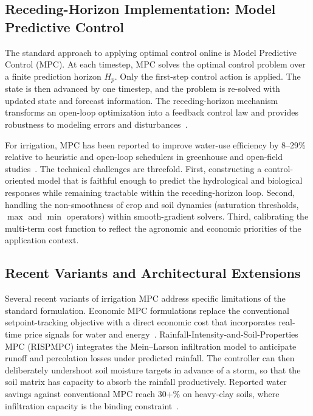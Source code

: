 \subsection{Receding-Horizon Implementation: Model Predictive Control}
\label{ssec:lit-mpc-impl}

The standard approach to applying optimal control online is Model
Predictive Control (MPC). At each timestep, MPC solves the optimal
control problem over a finite prediction horizon $H_p$. Only the
first-step control action is applied. The state is then advanced by
one timestep, and the problem is re-solved with updated state and
forecast information. The receding-horizon mechanism transforms an
open-loop optimization into a feedback control law and provides
robustness to modeling errors and
disturbances~\cite{LopezJimenez2022,Sharma2025}.

For irrigation, MPC has been reported to improve water-use efficiency
by 8--29\% relative to heuristic and open-loop schedulers in
greenhouse and open-field studies~\cite{LopezJimenez2022,Mahmud2026}.
The technical challenges are threefold. First, constructing a
control-oriented model that is faithful enough to predict the
hydrological and biological responses while remaining tractable
within the receding-horizon loop. Second, handling the non-smoothness
of crop and soil dynamics (saturation thresholds, $\max$ and $\min$
operators) within smooth-gradient solvers. Third, calibrating the
multi-term cost function to reflect the agronomic and economic
priorities of the application context.

\subsection{Recent Variants and Architectural Extensions}
\label{ssec:lit-mpc-variants}

Several recent variants of irrigation MPC address specific
limitations of the standard formulation. Economic MPC formulations
replace the conventional setpoint-tracking objective with a direct
economic cost that incorporates real-time price signals for water
and energy~\cite{Sharma2025}. Rainfall-Intensity-and-Soil-Properties
MPC (RISPMPC) integrates the Mein--Larson infiltration model to
anticipate runoff and percolation losses under predicted rainfall.
The controller can then deliberately undershoot soil moisture targets
in advance of a storm, so that the soil matrix has capacity to
absorb the rainfall productively. Reported water savings against
conventional MPC reach 30+\% on heavy-clay soils, where infiltration
capacity is the binding constraint~\cite{Sharma2025}.

